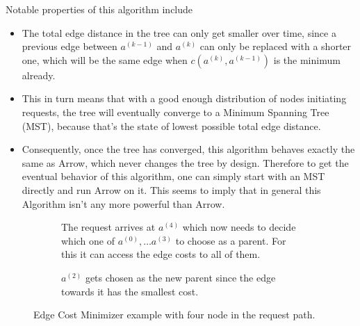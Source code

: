 \documentclass[a4paper, oneside]{discothesis}
\begin{document}
Notable properties of this algorithm include
\begin{itemize}
\item The total edge distance in the tree can only get smaller over time, since a previous edge between $a^{(k-1)}$ and $a^{(k)}$ can only be replaced with a shorter one, which will be the same edge when $c(a^{(k)},a^{(k-1)})$ is the minimum already.
\item This in turn means that with a good enough distribution of nodes initiating requests, the tree will eventually converge to a Minimum Spanning Tree (MST), because that's the state of lowest possible total edge distance.
\item Consequently, once the tree has converged, this algorithm behaves exactly the same as Arrow, which never changes the tree by design. Therefore to get the eventual behavior of this algorithm, one can simply start with an MST directly and run Arrow on it. This seems to imply that in general this Algorithm isn't any more powerful than Arrow.
\end{itemize}

\begin{figure}
\begin{subfigure}[t]{0.5\textwidth}
\centering
{}
\caption{The request arrives at $a^{(4)}$ which now needs to decide which one of $a^{(0)},\dots a^{(3)}$ to choose as a parent. For this it can access the edge costs to all of them.}
\end{subfigure}
\quad
\begin{subfigure}[t]{0.5\textwidth}
\centering
{}
\caption{$a^{(2)}$ gets chosen as the new parent since the edge towards it has the smallest cost.}
\end{subfigure}
\caption{Edge Cost Minimizer example with four node in the request path.}
\label{fig:ecm}
\end{figure}
\end{document}
